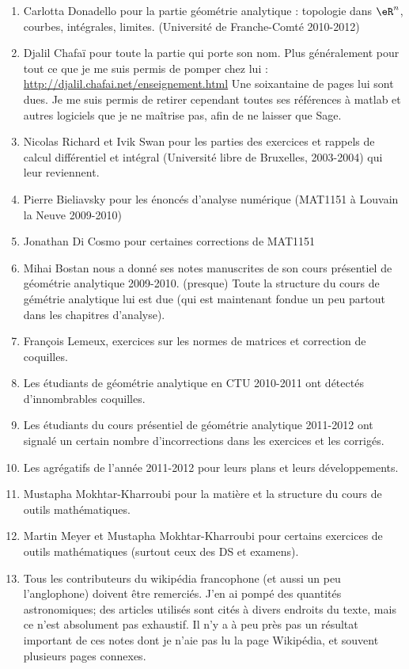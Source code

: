 \begin{enumerate}
    \item Carlotta Donadello pour la partie géométrie analytique : topologie dans \( \eR^n\), courbes, intégrales, limites. (Université de Franche-Comté 2010-2012)
    \item Djalil Chafaï pour toute la partie qui porte son nom. Plus généralement pour tout ce que je me suis permis de pomper chez lui :\\ \href{http://djalil.chafai.net/enseignement.html}{http://djalil.chafai.net/enseignement.html} Une soixantaine de pages lui sont dues. Je me suis permis de retirer cependant toutes ses références à matlab et autres logiciels que je ne maîtrise pas, afin de ne laisser que Sage.
    \item Nicolas Richard et Ivik Swan pour les parties des exercices et rappels de calcul différentiel et intégral (Université libre de Bruxelles, 2003-2004) qui leur reviennent.
    \item Pierre Bieliavsky pour les énoncés d'analyse numérique (MAT1151 à Louvain la Neuve 2009-2010)
    \item Jonathan Di Cosmo pour certaines corrections de MAT1151
    \item
        Mihai Bostan nous a donné ses notes manuscrites de son cours présentiel de géométrie analytique 2009-2010. (presque) Toute la structure du cours de gémétrie analytique lui est due (qui est maintenant fondue un peu partout dans les chapitres d'analyse).
    \item
        François Lemeux, exercices sur les normes de matrices et correction de coquilles.
    \item
        Les étudiants de géométrie analytique en CTU 2010-2011 ont détectés d'innombrables coquilles.
    \item
        Les étudiants du cours présentiel de géométrie analytique 2011-2012 ont signalé un certain nombre d'incorrections dans les exercices et les corrigés.
    \item
        Les agrégatifs de l'année 2011-2012 pour leurs plans et leurs développements.
    \item
        Mustapha Mokhtar-Kharroubi pour la matière et la structure du cours de outils mathématiques.
    \item
        Martin Meyer et Mustapha Mokhtar-Kharroubi pour certains exercices de outils mathématiques (surtout ceux des DS et examens).
    \item
        Tous les contributeurs du wikipédia francophone (et aussi un peu l'anglophone) doivent être remerciés. J'en ai pompé des quantités astronomiques; des articles utilisés sont cités à divers endroits du texte, mais ce n'est absolument pas exhaustif. Il n'y a à peu près pas un résultat important de ces notes dont je n'aie pas lu la page Wikipédia, et souvent plusieurs pages connexes.

\end{enumerate}
